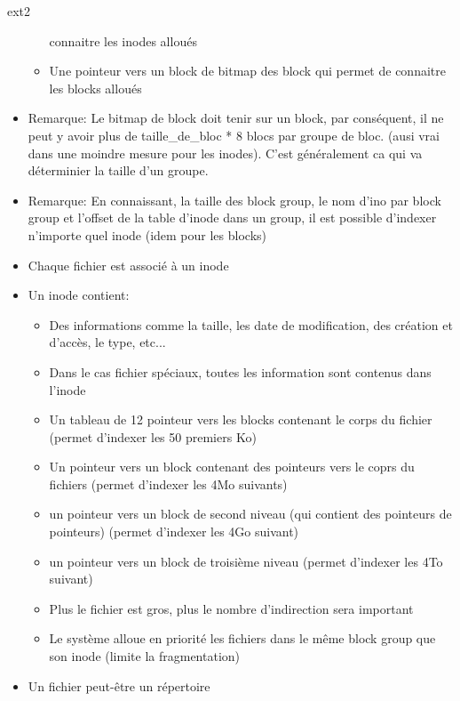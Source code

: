 \begin{frame}[fragile=singleslide]{ext2}
\begin{itemize}
\begin{itemize}
      connaitre les inodes alloués
    \item Une pointeur vers un block de bitmap des block qui permet de
      connaitre les blocks alloués
    \end{itemize}
  \item  Remarque: Le bitmap  de block  doit tenir  sur un  block, par
    conséquent, il ne  peut y avoir plus de  taille\_de\_bloc * 8 blocs
    par groupe  de bloc. (ausi vrai  dans une moindre  mesure pour les
    inodes). C'est  généralement ca qui va déterminier  la taille d'un
    groupe.
  \item Remarque:  En connaissant, la  taille des block group,  le nom
    d'ino  par block group  et l'offset  de la  table d'inode  dans un
    group, il  est possible d'indexer n'importe quel  inode (idem pour
    les blocks)
  \item Chaque fichier est associé à un inode
  \item Un inode contient:
    \begin{itemize}
    \item Des informations comme  la taille, les date de modification,
      des création et d'accès, le type, etc...
    \item Dans  le cas fichier  spéciaux, toutes les  information sont
      contenus dans l'inode
    \item Un tableau de 12 pointeur vers les blocks contenant le corps
      du fichier (permet d'indexer les 50 premiers Ko)
    \item Un  pointeur vers un  block contenant des pointeurs  vers le
      coprs du fichiers (permet d'indexer les 4Mo suivants)
    \item un pointeur vers un block de second niveau (qui contient des
      pointeurs de pointeurs) (permet d'indexer les 4Go suivant)
    \item  un  pointeur vers  un  block  de  troisième niveau  (permet
      d'indexer les 4To suivant)
    \item Plus le fichier est  gros, plus le nombre d'indirection sera
      important
    \item  Le système  alloue en  priorité les  fichiers dans  le même
      block group que son inode (limite la fragmentation)
    \end{itemize}
  \item Un fichier peut-être un répertoire

\end{itemize}
\end{frame}
